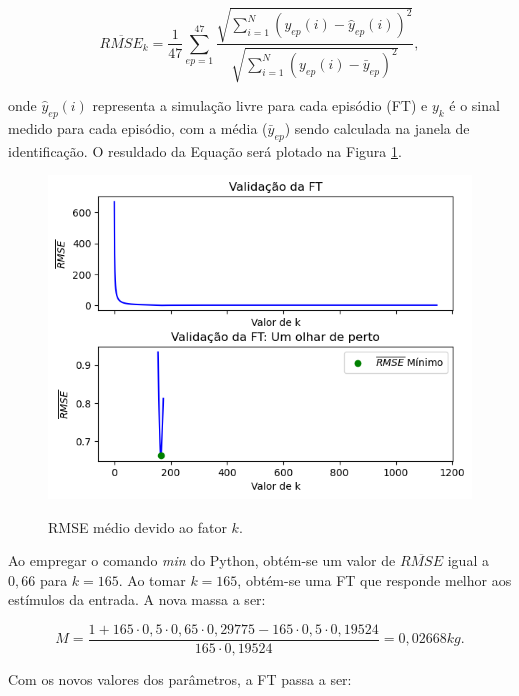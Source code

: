 \documentclass[12pt,           %
a4paper,                       %
openany,                       %
oneside,                       %
chapter=TITLE,                 %
english,                       %
spanish,                       %
brazil,                        %
sumario=tradicional]{abntex2}  %
\begin{document}
\begin{OnehalfSpace}
\begin{equation}
    \overline{RMSE}_k = \frac{1}{47} \sum_{ep=1}^{47} \frac{\sqrt{\sum_{i=1}^{N}(y_{ep}(i)-\hat{y}_{ep}(i))^2}}{\sqrt{\sum_{i=1}^{N}(y_{ep}(i)-\bar{y}_{ep})^2}},
\label{eq:RMSE}
\end{equation}

\noindent onde $\hat{y}_{ep}(i)$ representa a simulação livre para cada episódio (FT) e ${y}_k$ é o sinal medido para cada episódio, com a média ($\bar{y}_{ep}$) sendo calculada na janela de identificação. O resuldado da Equação \label{eq:RMSE} será plotado na Figura \ref{fig:R}.

\begin{figure}[H]
     \centering
     \vspace*{-0.25cm}
     \caption{RMSE médio devido ao fator $k$.}
     \includegraphics[scale=.53]{RMSE1.png}
     \label{fig:R}
\end{figure}
\vspace*{-.85cm}
{\raggedright {}}

Ao empregar o comando \textit{min} do Python, obtém-se um valor de $\overline{RMSE}$ igual a $0,66$ para $k=165$. Ao tomar $k=165$, obtém-se uma FT que responde melhor aos estímulos da entrada. A nova massa a ser:

\begin{equation}
    M = \frac{1 + 165\cdot0,5\cdot0,65\cdot0,29775-165\cdot0,5\cdot0,19524}{165\cdot0,19524} = 0,02668 kg.
    \label{eq:MV}
\end{equation}

Com os novos valores dos parâmetros, a FT passa a ser:


\end{OnehalfSpace}
\end{document}
